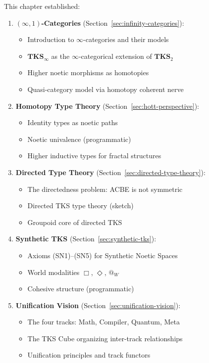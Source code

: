 \begin{remark}
\label{rem:ch7-summary}
This chapter established:
\begin{enumerate}
  \item \textbf{$(\infty,1)$-Categories} (Section~\ref{sec:infinity-categories}):
    \begin{itemize}
      \item Introduction to $\infty$-categories and their models
      \item $\mathbf{TKS}_\infty$ as the $\infty$-categorical extension of $\mathbf{TKS}_2$
      \item Higher noetic morphisms as homotopies
      \item Quasi-category model via homotopy coherent nerve
    \end{itemize}
  \item \textbf{Homotopy Type Theory} (Section~\ref{sec:hott-perspective}):
    \begin{itemize}
      \item Identity types as noetic paths
      \item Noetic univalence (programmatic)
      \item Higher inductive types for fractal structures
    \end{itemize}
  \item \textbf{Directed Type Theory} (Section~\ref{sec:directed-type-theory}):
    \begin{itemize}
      \item The directedness problem: ACBE is not symmetric
      \item Directed TKS type theory (sketch)
      \item Groupoid core of directed TKS
    \end{itemize}
  \item \textbf{Synthetic TKS} (Section~\ref{sec:synthetic-tks}):
    \begin{itemize}
      \item Axioms (SN1)--(SN5) for Synthetic Noetic Spaces
      \item World modalities $\Box$, $\Diamond$, $@_W$
      \item Cohesive structure (programmatic)
    \end{itemize}
  \item \textbf{Unification Vision} (Section~\ref{sec:unification-vision}):
    \begin{itemize}
      \item The four tracks: Math, Compiler, Quantum, Meta
      \item The TKS Cube organizing inter-track relationships
      \item Unification principles and track functors
    \end{itemize}
\end{enumerate}
\end{remark}

